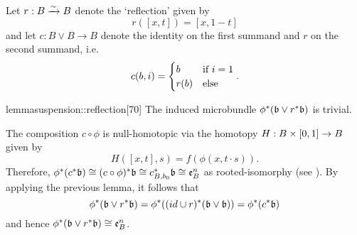 \begin{myparagraph}
    Let $r: B \isomto B$ denote the `reflection' given by
    \[ r([x, t]) = [x, 1 - t] \]
    and let $c: B \vee B \to B$ denote
    the identity on the first summand and $r$ on the second summand, i.e.
    \[ c(b, i) = \case{b}{r(b)}{i = 1}. \]
\end{myparagraph}

\begin{mystatement}{lemma}{suspension::reflection}[70]
    The induced microbundle $\ind{\phi}(\bb \vee \ind{r}\bb)$ is trivial.
\end{mystatement}

\begin{myproof}
    The composition $c \circ \phi$ is null-homotopic via
    the homotopy $H: B \cross \I \to B$ given by
    \[ H([x, t], s) = f(\phi(x, t \cdot s)). \]
    Therefore, $\ind{\phi}(\ind{c}\bb) \cong \ind{(c \circ \phi)}\bb \cong \ind{c_{B, b_0}}\bb \cong \be{B}$
    as rooted-isomorphy (see ).
    By applying the previous lemma,
    it follows that
    \[ \ind{\phi}(\bb \vee \ind{r}\bb) = \ind{\phi}(\ind{(id \cup r)}(\bb \vee \bb)) = \ind{\phi}(\ind{c}\bb) \]
    and hence $\ind{\phi}(\bb \vee \ind{r}\bb) \cong \be{B}$.
\end{myproof}